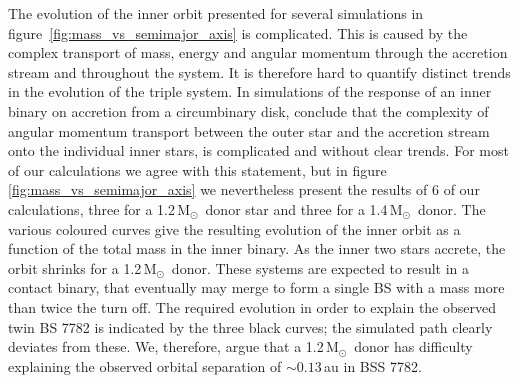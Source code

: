 \documentclass[twocolumn]{aastex62}
\newcommand{\MSun}{\mbox{M$_\odot$}}
\begin{document}
The evolution of the inner orbit presented for several simulations in
figure~\ref{fig:mass_vs_semimajor_axis} is complicated.  This is
caused by the complex transport of mass, energy and angular momentum
through the accretion stream and throughout the system.  It is
therefore hard to quantify distinct trends in the evolution of the
triple system. In simulations of the response of an inner binary on
accretion from a circumbinary disk, \cite{2018arXiv181208175M}
conclude that the complexity of angular momentum transport between the
outer star and the accretion stream onto the individual inner stars,
is complicated and without clear trends. For most of our calculations
we agree with this statement, but in
figure~\,\ref{fig:mass_vs_semimajor_axis} we nevertheless present the
results of 6 of our calculations, three for a 1.2\,\MSun\, donor star
and three for a 1.4\,\MSun\, donor. The various coloured curves give
the resulting evolution of the inner orbit as a function of the total
mass in the inner binary. As the inner two stars accrete, the orbit
shrinks for a 1.2\,\MSun\, donor. These systems are expected to result
in a contact binary, that eventually may merge to form a single BS
with a mass more than twice the turn off. The required evolution in
order to explain the observed twin BS 7782 is indicated by the three
black curves; the simulated path clearly deviates from these. We,
therefore, argue that a 1.2\,\MSun\, donor has difficulty explaining
the observed orbital separation of $\sim 0.13$\,au in BSS 7782.
\end{document}
